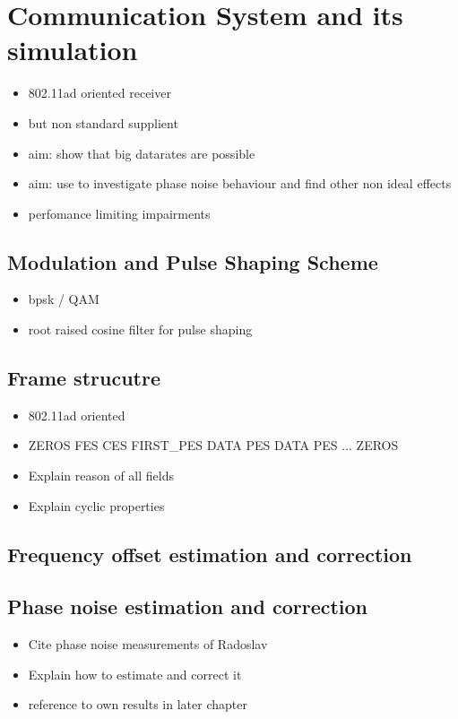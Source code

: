 \chapter{Communication System and its simulation}


\begin{itemize}
\item 802.11ad oriented receiver
\item but non standard supplient
\item aim: show that big datarates are possible
\item aim: use to investigate phase noise behaviour and find other non ideal effects
\item perfomance limiting impairments
\end{itemize}

\section{Modulation and Pulse Shaping Scheme}
\begin{itemize}
\item bpsk / QAM
\item root raised cosine filter for pulse shaping
\end{itemize}


\section{Frame strucutre}
\begin{itemize}
\item 802.11ad oriented
\item ZEROS FES CES FIRST\_PES DATA PES DATA PES ... ZEROS
\item Explain reason of all fields
\item Explain cyclic properties
\end{itemize}

\section{Frequency offset estimation and correction}

\section{Phase noise estimation and correction}
\begin{itemize}
\item Cite phase noise measurements of Radoslav
\item Explain how to estimate and correct it
\item reference to own results in later chapter
\end{itemize}

